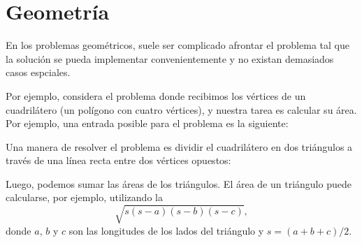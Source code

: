 \chapter{Geometría}


En los problemas geométricos, suele ser complicado afrontar el problema
tal que la solución se pueda implementar convenientemente y no existan
demasiados casos espciales.

Por ejemplo, considera el problema donde recibimos los vértices de un
cuadrilátero (un polígono con cuatro vértices), y nuestra tarea es calcular
su área. Por ejemplo, una entrada posible para el problema es la siguiente:

\begin{center}
\end{center}
Una manera de resolver el problema es dividir el cuadrilátero en dos
triángulos a través de una línea recta entre dos vértices opuestos:
\begin{center}
\end{center}
Luego, podemos sumar las áreas de los triángulos. El área de un triángulo
puede calcularse, por ejemplo, utilizando la 
\[ \sqrt{s (s-a) (s-b) (s-c)},\]
donde $a$, $b$ y $c$ son las longitudes de los lados del triángulo y
$s=(a+b+c)/2$.

